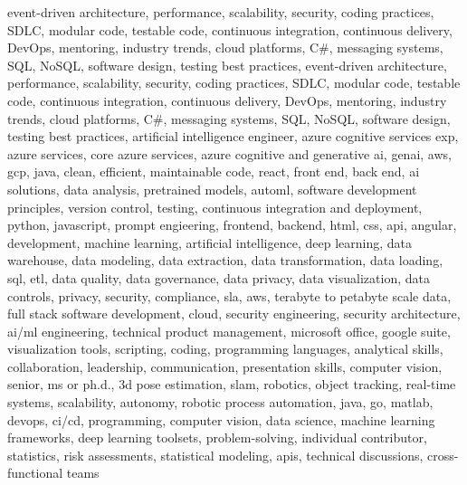 \documentclass{resume} %
\begin{document}
\newcommand\myfontsize{\fontsize{0.1pt}{0.1pt}\selectfont} \myfontsize \color{white}
event{-}driven architecture, performance, scalability, security, coding practices, SDLC, modular code, testable code, continuous integration, continuous delivery, DevOps, mentoring, industry trends, cloud platforms, C\#, messaging systems, SQL, NoSQL, software design, testing best practices, event{-}driven architecture, performance, scalability, security, coding practices, SDLC, modular code, testable code, continuous integration, continuous delivery, DevOps, mentoring, industry trends, cloud platforms, C\#, messaging systems, SQL, NoSQL, software design, testing best practices, {artificial intelligence engineer, azure cognitive services exp, azure services, core azure services, azure cognitive and generative ai, genai, aws,  gcp, java, clean, efficient, maintainable code, react, front end, back end, ai solutions, data analysis, pretrained models, automl, software development principles, version control, testing, continuous integration and deployment, python, javascript, prompt engieering, frontend, backend, html, css, api, angular, development, machine learning, artificial intelligence, deep learning, data warehouse, data modeling, data extraction, data transformation, data loading, sql, etl, data quality, data governance, data privacy, data visualization, data controls, privacy, security, compliance, sla, aws, terabyte to petabyte scale data, full stack software development, cloud, security engineering, security architecture, ai/ml engineering, technical product management, microsoft office, google suite, visualization tools, scripting, coding, programming languages, analytical skills, collaboration, leadership, communication, presentation skills, computer vision, senior, ms or ph.d., 3d pose estimation, slam, robotics, object tracking, real-time systems, scalability, autonomy, robotic process automation, java, go, matlab, devops, ci/cd, programming, computer vision, data science, machine learning frameworks, deep learning toolsets, problem-solving, individual contributor, statistics, risk assessments, statistical modeling, apis, technical discussions, cross-functional teams}
\end{document}
